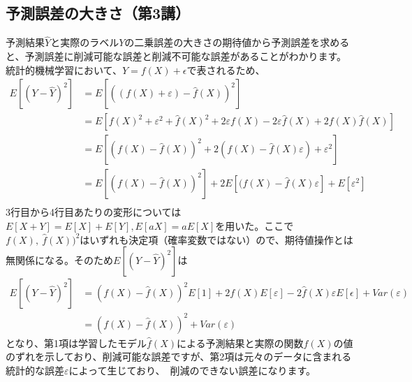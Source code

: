 \documentclass[uplatex]{jsarticle}
\begin{document}
\subsection{予測誤差の大きさ（第3講）}
予測結果$\hat{Y}$と実際のラベル$Y$の二乗誤差の大きさの期待値から予測誤差を求めると、予測誤差に削減可能な誤差と削減不可能な誤差があることがわかります。
統計的機械学習において、$Y = f(X) + \epsilon$で表されるため、
\begin{equation*}
\begin{split}
E[(Y - \hat{Y})^2]&=E[((f(X) + \varepsilon) - \hat{f}(X))^2] \\
&=E[f(X)^2 + \varepsilon ^2 + \hat{f}(X)^2 + 2 \varepsilon f(X) - 2\varepsilon \hat{f}(X) + 2f(X)\hat{f}(X)] \\
&=E[(f(X) - \hat{f}(X))^2 + 2(f(X) - \hat{f}(X)\varepsilon) + \varepsilon^2] \\
&=E[(f(X) - \hat{f}(X))^2] + 2E[(f(X) - \hat{f}(X)\varepsilon] + E[\varepsilon^2] \\
\end{split}
\end{equation*}
3行目から4行目あたりの変形については$E[X + Y] = E[X] + E[Y], E[aX] = aE[X]$を用いた。ここで$f(X),\ \hat{f}(X))^2$はいずれも決定項（確率変数ではない）ので、期待値操作とは無関係になる。そのため$E[(Y - \hat{Y})^2]$は
\begin{equation*}
\begin{split}
E[(Y - \hat{Y})^2]&=(f(X) - \hat{f}(X))^2E[1] + 2f(X)E[\varepsilon] - 2\hat{f}(X)\varepsilon E[\epsilon] + Var(\varepsilon) \\
&=(f(X) - \hat{f}(X))^2 + Var(\varepsilon)
\end{split}
\end{equation*}
となり、第1項は学習したモデル$\hat{f}(X)$による予測結果と実際の関数$f(X)$の値のずれを示しており、削減可能な誤差ですが、第2項は元々のデータに含まれる統計的な誤差$\varepsilon$によって生じており、\
削減のできない誤差になります。
\end{document}
